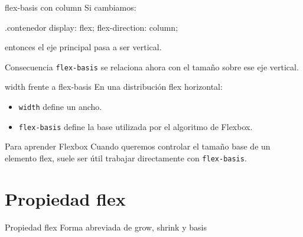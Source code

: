 \documentclass[aspectratio=169,11.5pt]{beamer}
\begin{document}
    \begin{frame}[fragile]{flex-basis con column}
        Si cambiamos:

        \begin{csscodedark}
            .contenedor {
                display: flex;
                flex-direction: column;
            }
        \end{csscodedark}

        entonces el eje principal pasa a ser vertical.

        \begin{block}{Consecuencia}
            \texttt{flex-basis} se relaciona ahora
            con el tamaño sobre ese eje vertical.
        \end{block}
    \end{frame}

    \begin{frame}{width frente a flex-basis}
        En una distribución flex horizontal:

        \begin{itemize}
            \item \texttt{width} define un ancho.
            \item \texttt{flex-basis} define la base
            utilizada por el algoritmo de Flexbox.
        \end{itemize}

        \begin{block}{Para aprender Flexbox}
            Cuando queremos controlar el tamaño base
            de un elemento flex, suele ser útil
            trabajar directamente con \texttt{flex-basis}.
        \end{block}
    \end{frame}



    \section{Propiedad flex}

    \SectionSlide
    {Propiedad flex}
    {Forma abreviada de grow, shrink y basis}
\end{document}
